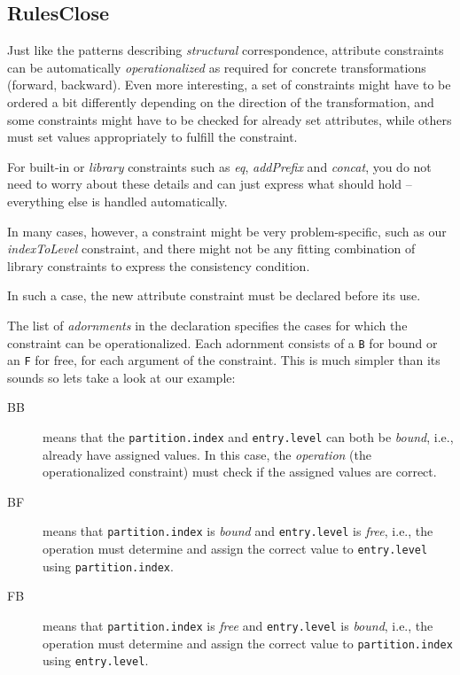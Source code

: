 \newpage
\hypertarget{rules common}{}
\subsection{RulesClose}
\texHeader

Just like the patterns describing \emph{structural} correspondence,  attribute constraints can be automatically \emph{operationalized} as required for  concrete
transformations (forward, backward). Even more interesting, a set of constraints might have to be ordered a bit differently depending on the direction of the
transformation, and some constraints might have to be checked for already set attributes, while others must set values appropriately to fulfill the constraint.

For built-in or \emph{library} constraints such as \emph{eq}, \emph{addPrefix} and \emph{concat}, you do not need to worry about these details and can just
express what should hold -- everything else is handled automatically.

In many cases, however, a constraint might be very problem-specific, such as our \emph{indexToLevel} constraint, and there might not be any fitting combination
of library constraints to express the consistency condition.

In such a case, the new attribute constraint must be declared before its use.

The list of \emph{adornments} in the declaration specifies the cases for which the constraint can be operationalized. Each adornment consists of a \texttt{B}
for bound or an \texttt{F} for free, for each argument of the constraint. This is much simpler than its sounds so lets take a look at our example:

\begin{description}

\item[BB] means that the \texttt{partition.index} and \texttt{entry.level} can both be \emph{bound}, i.e., already have assigned values.
In this case, the \emph{operation} (the operationalized constraint) must check if the assigned values are correct.

\item[BF] means that \texttt{partition.index} is \emph{bound} and \texttt{entry.level} is \emph{free}, i.e., the operation must determine and assign the correct
value to \texttt{entry.level} using \texttt{partition.index}.

\item[FB] means that \texttt{partition.index} is \emph{free} and \texttt{entry.level} is \emph{bound}, i.e., the operation must determine and assign the correct
value to \texttt{parti\-tion.in\-dex} using \texttt{entry.level}.

\end{description}

